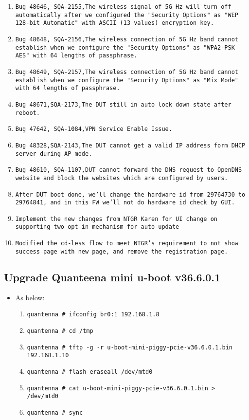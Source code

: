 \documentclass[12pt]{report}
\begin{document}
\begin{itemize}
\begin{enumerate}
		\item \texttt{Bug 48646, SQA-2155,The wireless signal of 5G Hz will turn off automatically after we configured the "Security Options" as "WEP 128-bit Automatic" with ASCII (13 values) encryption key.}
		\item \texttt{Bug 48648, SQA-2156,The wireless connection of 5G Hz band cannot establish when we configure the "Security Options" as "WPA2-PSK AES" with 64 lengths of passphrase.}
		\item \texttt{Bug 48649, SQA-2157,The wireless connection of 5G Hz band cannot establish when we configure the "Security Options" as "Mix Mode" with 64 lengths of passphrase.}
		\item \texttt{Bug 48671,SQA-2173,The DUT still in auto lock down state after reboot.}
		\item \texttt{Bug 47642, SQA-1084,VPN Service Enable Issue.}
		\item \texttt{Bug 48328,SQA-2143,The DUT cannot get a valid IP address form DHCP server during AP mode.}
		\item \texttt{Bug 48610, SQA-1107,DUT cannot forward the DNS request to OpenDNS website and block the websites which are configured by users.}
		\item \texttt{After DUT boot done, we'll change the hardware id from 29764730 to 29764841, and in this FW we'll not do hardware id check by GUI.}
		\item \texttt{Implement the new changes from NTGR Karen for UI change on supporting two opt-in mechanism for auto-update}
		\item \texttt{Modified the cd-less flow to meet NTGR's requirement to not show success page with new page, and remove the registration page.}
    	\end{enumerate}
    \end{itemize}

    \subsection{Upgrade Quanteena mini u-boot v36.6.0.1}
    \begin{itemize}
    \item As below:
    	\begin{enumerate}
		\item \texttt{quantenna \# ifconfig br0:1 192.168.1.8}
		\item \texttt{quantenna \# cd /tmp}
		\item \texttt{quantenna \# tftp -g -r u-boot-mini-piggy-pcie-v36.6.0.1.bin 192.168.1.10}
		\item \texttt{quantenna \# flash\_eraseall /dev/mtd0}
		\item \texttt{quantenna \# cat u-boot-mini-piggy-pcie-v36.6.0.1.bin > /dev/mtd0}
		\item \texttt{quantenna \# sync}
    	\end{enumerate}
    \end{itemize}
\end{document}

